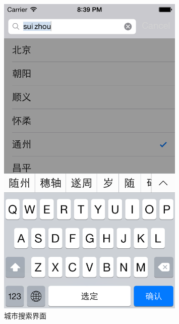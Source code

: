 \documentclass[UTF8,nofonts]{ctexart}
\begin{document}
\begin{figure}[hbt]
\centering
\includegraphics[width=0.8\textwidth]{5.png}
\caption{城市搜索界面}
\end{figure}
\end{document}
